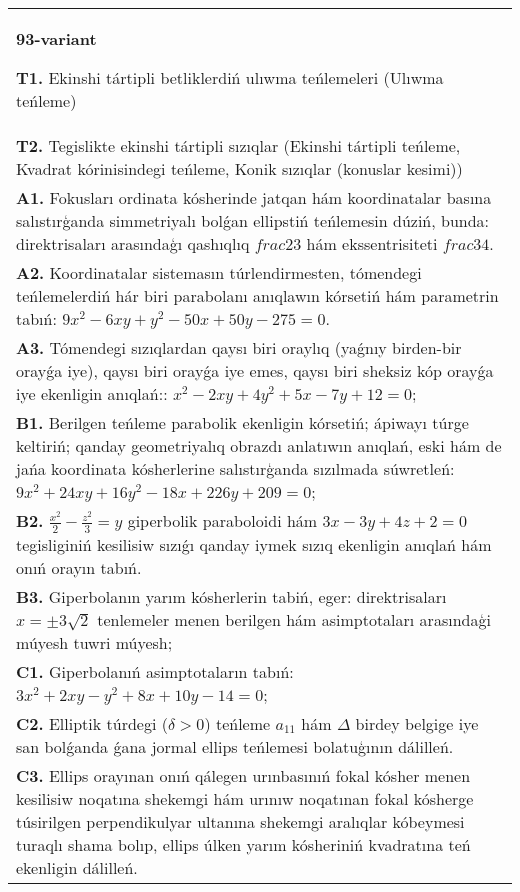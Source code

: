 \documentclass{article}
\begin{document}
\begin{tabular}{m{17cm}}
\textbf{93-variant}
\newline

\textbf{T1.} Ekinshi tártipli betliklerdiń ulıwma teńlemeleri (Ulıwma teńleme) \\
\textbf{T2.} Tegislikte ekinshi tártipli sızıqlar (Ekinshi tártipli teńleme, Kvadrat kórinisindegi teńleme, Konik sızıqlar (konuslar kesimi)) \\
\textbf{A1.} Fokusları ordinata kósherinde jatqan hám koordinatalar basına salıstırģanda simmetriyalı bolǵan ellipstiń teńlemesin dúziń, bunda: direktrisaları arasındaģı qashıqlıq $frac{2}{3}$ hám ekssentrisiteti $frac{3}{4}$. \\
\textbf{A2.} Koordinatalar sistemasın túrlendirmesten, tómendegi teńlemelerdiń hár biri parabolanı anıqlawın kórsetiń hám parametrin tabıń: $9 x^2-6 x y+y^2-50 x+50 y-275=0$. \\
\textbf{A3.} Tómendegi sızıqlardan qaysı biri oraylıq (yaǵnıy birden-bir orayǵa iye), qaysı biri orayǵa iye emes, qaysı biri sheksiz kóp orayǵa iye ekenligin anıqlań:: $x^2-2 x y+4 y^2+5 x-7 y+12=0$; \\
\textbf{B1.} Berilgen teńleme parabolik ekenligin kórsetiń; ápiwayı túrge keltiriń; qanday geometriyalıq obrazdı anlatıwın anıqlań, eski hám de jańa koordinata kósherlerine salıstırģanda sızılmada súwretleń: $9 x^2+24 x y+16 y^2-18 x+226 y+209=0$; \\
\textbf{B2.} $\frac{x^2}{2}-\frac{z^2}{3}=y$ giperbolik paraboloidi hám $3x-3y+4z+2=0$ tegisliginiń kesilisiw sızıǵı qanday iymek sızıq ekenligin anıqlań hám onıń orayın tabıń. \\
\textbf{B3.} Giperbolanın yarım kósherlerin tabiń, eger: direktrisaları $x= \pm 3 \sqrt{2}$ tenlemeler menen berilgen hám asimptotaları arasındaģi múyesh tuwri múyesh; \\
\textbf{C1.} Giperbolanıń asimptotaların tabıń: $3 x^2+2 x y-y^2+8 x+10 y-14=0$; \\
\textbf{C2.} Elliptik túrdegi ($\delta>0$) teńleme $a_{11}$ hám $\Delta$ birdey belgige iye san bolǵanda ǵana jormal ellips teńlemesi bolatuģının dálilleń. \\
\textbf{C3.} Ellips orayınan onıń qálegen urınbasınıń fokal kósher menen kesilisiw noqatına shekemgi hám urınıw noqatınan fokal kósherge túsirilgen perpendikulyar ultanına shekemgi aralıqlar kóbeymesi turaqlı shama bolıp, ellips úlken yarım kósheriniń kvadratına teń ekenligin dálilleń. \\

\end{tabular}
\vspace{1cm}
\end{document}
